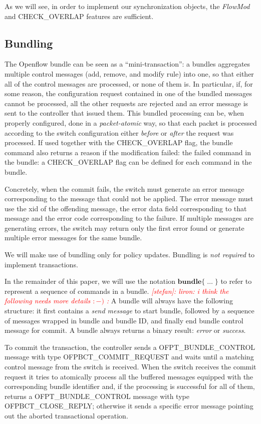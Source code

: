\documentclass[conference]{sigcomm-alternate}
\newcommand{\stefan}[1]{\textit{\textcolor{red}{[stefan]: #1}}} %
\begin{document}
As we will see, in order to implement our synchronization objects,
the \emph{FlowMod} and CHECK\_OVERLAP features are sufficient.


\subsection{Bundling}

The Openflow bundle can be seen as a ``mini-transaction'':
a bundles aggregates multiple control messages (add, remove, and modify rule)
into one, so that either all of the control messages are
processed, or none of them is. In particular, if, for some reason, the
configuration request contained in one of the bundled messages cannot
be processed, all the other requests  are rejected and an error
message is sent to the controller that issued them.
This bundled processing can be, when properly configured, done in a
\emph{packet-atomic} way, so that each packet is processed according
to the switch configuration either \emph{before} or \emph{after} the
request was processed.
If used together with the CHECK\_OVERLAP flag, the bundle command also returns a reason 
if the modification failed: the failed command in the bundle:
a CHECK\_OVERLAP flag can be defined for each command in the bundle.

Concretely, when the commit fails, the switch must generate an error message corresponding to the
message that could not be applied. The error message must use the xid of the offending message,
the error data field corresponding to that message and the error code corresponding to the failure. If
multiple messages are generating errors, the switch may return only the first error found or generate
multiple error messages for the same bundle.

We will make use of bundling only for policy updates. 
Bundling is \emph{not required} to implement transactions.

In the remainder of this paper, we will use the notation 
$\textbf{bundle}\{\;\ldots\;\}$ to refer to represent a
sequence of commands in a bundle.
\stefan{liron: i think the following needs more details $:-)$ :} A bundle will always have the following structure:
it first contains a \emph{send message} to start bundle,
followed by a sequence of messages wrapped in bundle and bundle ID, 
and finally end bundle control message for commit.
A bundle always returns a binary result: \emph{error} or \emph{success}.


To commit the transaction,  the controller sends a \textsf{OFPT\_BUNDLE\_CONTROL} message with type
\textsf{OFPBCT\_COMMIT\_REQUEST} and waits until a matching control
message from the switch is received. When the switch receives the
commit request it tries to atomically process all the buffered messages
equipped with the corresponding bundle identifier and, if the
processing is successful for all of them, returns  a \textsf{OFPT\_BUNDLE\_CONTROL} message with type
\textsf{OFPBCT\_CLOSE\_REPLY}; otherwise it sends a specific error
message  pointing out the aborted transactional operation.
\end{document}
